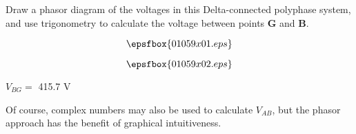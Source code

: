

Draw a phasor diagram of the voltages in this Delta-connected polyphase system, and use trigonometry to calculate the voltage between points {\bf G} and {\bf B}.  

$$\epsfbox{01059x01.eps}$$







$$\epsfbox{01059x02.eps}$$

$V_{BG} =$ 415.7 V







Of course, complex numbers may also be used to calculate $V_{AB}$, but the phasor approach has the benefit of graphical intuitiveness.




